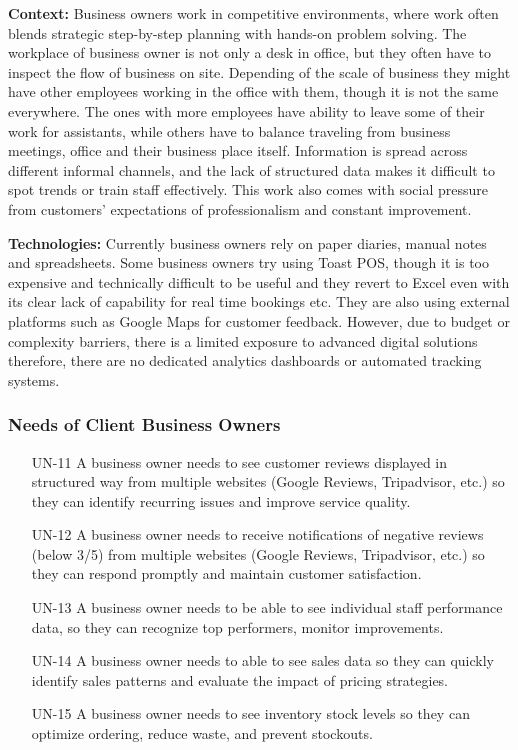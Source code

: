 \documentclass[]{VUMIFTemplateClass}
\newcommand{\noticecomment}[1]{%
    \begin{tcolorbox}[colback=blue!20, colframe=blue!60, arc=0pt, outer arc=0pt, boxrule=1pt, left=3pt, right=3pt, top=3pt, bottom=3pt]
        \textbf{\textcolor{blue!70!black}{NOTE:}} #1
    \end{tcolorbox}
}
\begin{document}
    \textbf{Context:} Business owners work in competitive environments, where
work often blends strategic step-by-step planning with hands-on problem solving.
The workplace of business owner is not only a desk in office, but they often
have to inspect the flow of business on site. Depending of the scale of business
they might have other employees working in the office with them, though it is
not the same everywhere. The ones with more employees have ability to leave some
of their work for assistants, while others have to balance traveling from
business meetings, office and their business place itself. Information is spread
across different informal channels, and the lack of structured data makes it
difficult to spot trends or train staff effectively. This work also comes with
social pressure from customers' expectations of professionalism and constant
improvement.

    \textbf{Technologies:} Currently business owners rely on paper diaries,
manual notes and spreadsheets. Some business owners try using Toast POS, though
it is too expensive and technically difficult to be useful and they revert to
Excel even with its clear lack of capability for real time bookings etc. They
are also using external platforms such as Google Maps for
customer feedback. However, due to budget or complexity barriers, there is a
limited exposure to advanced digital solutions therefore, there are no dedicated
analytics dashboards or automated tracking systems.

\subsubsection{Needs of Client Business Owners}
\begin{itemize}
    \item[UN-11]\label{UN-11} A business owner needs to see customer reviews displayed in structured way from multiple websites (Google Reviews, Tripadvisor, etc.) so they can identify recurring issues and improve service quality.
    \item[UN-12]\label{UN-12} A business owner needs to receive notifications of negative reviews (below 3/5) from multiple websites (Google Reviews, Tripadvisor, etc.) so they can respond promptly and maintain customer satisfaction.
    \item[UN-13]\label{UN-13} A business owner needs to be able to see individual staff performance data, so they can recognize top performers, monitor improvements.
    \item[UN-14]\label{UN-14} A business owner needs to able to see sales data so they can quickly identify sales patterns and evaluate the impact of pricing strategies. 
    \item[UN-15]\label{UN-15} A business owner needs to see inventory stock levels so they can optimize ordering, reduce waste, and prevent stockouts.

\end{itemize}
\end{document}
